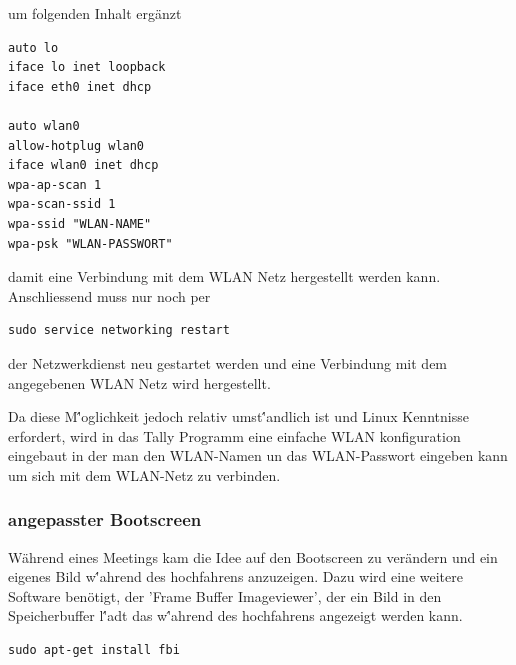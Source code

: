 \documentclass[11pt,a4paper]{article} %
\begin{document}
um folgenden Inhalt ergänzt
\begin{frame}

\begin{lstlisting}
auto lo
iface lo inet loopback
iface eth0 inet dhcp

auto wlan0
allow-hotplug wlan0
iface wlan0 inet dhcp
wpa-ap-scan 1
wpa-scan-ssid 1
wpa-ssid "WLAN-NAME"
wpa-psk "WLAN-PASSWORT"

\end{lstlisting}

\end{frame}
\newpage

damit eine Verbindung mit dem WLAN Netz hergestellt werden kann.
Anschliessend muss nur noch per
\begin{frame}

\begin{lstlisting}
sudo service networking restart
\end{lstlisting}

\end{frame}
der Netzwerkdienst neu gestartet werden und eine Verbindung mit dem angegebenen WLAN Netz wird hergestellt.
\par
Da diese M\''oglichkeit jedoch relativ umst\''andlich ist und Linux Kenntnisse erfordert, wird in das Tally Programm eine einfache WLAN konfiguration eingebaut in der man den WLAN-Namen un das WLAN-Passwort eingeben kann um sich mit dem WLAN-Netz zu verbinden.

\subsubsection{angepasster Bootscreen}
Während eines Meetings kam die Idee auf den Bootscreen zu verändern und ein eigenes Bild w\''ahrend des hochfahrens anzuzeigen. Dazu wird eine weitere Software benötigt, der 'Frame Buffer Imageviewer', der ein Bild in den Speicherbuffer l\''adt das w\''ahrend des hochfahrens angezeigt werden kann. \cite{berry7}
\begin{frame}

\begin{lstlisting}
sudo apt-get install fbi
\end{lstlisting}

\end{frame}
\end{document}
